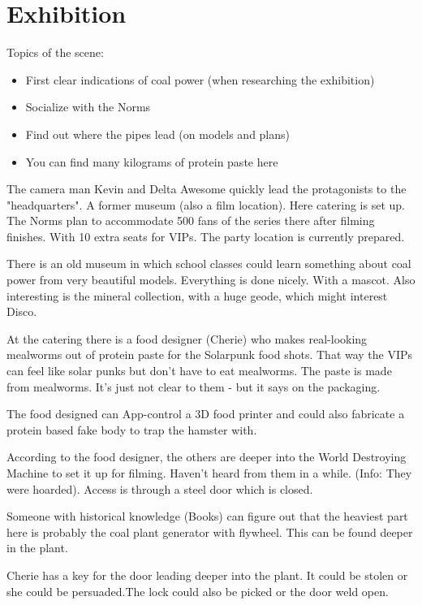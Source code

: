 \section{Exhibition}

Topics of the scene:
\begin{itemize}
\item First clear indications of coal power (when researching the exhibition)
\item Socialize with the Norms
\item Find out where the pipes lead (on models and plans)
\item You can find many kilograms of protein paste here
\end{itemize}


The camera man Kevin and Delta Awesome quickly lead the protagonists to the "headquarters". A former museum (also a film location). Here catering is set up. The Norms plan to accommodate 500 fans of the series there after filming finishes. With 10 extra seats for VIPs. The party location is currently prepared.

There is an old museum in which school classes could learn something about coal power from very beautiful models.
Everything is done nicely. With a mascot. Also interesting is the mineral collection, with a huge geode, which might interest Disco.

At the catering there is a food designer (Cherie) who makes real-looking mealworms out of protein paste for the Solarpunk food shots.  That way the VIPs can feel like solar punks but don't have to eat mealworms.
The paste is made from mealworms. It's just not clear to them - but it says on the packaging.

The food designed can App-control a 3D food printer and could also fabricate a protein based fake body to trap the hamster with.

According to the food designer, the others are deeper into the World Destroying Machine to set it up for filming. Haven't heard from them in a while. (Info: They were hoarded). Access is through a steel door which is closed.

Someone with historical knowledge (Books) can figure out that the heaviest part here is probably the coal plant generator with flywheel. This can be found deeper in the plant.

Cherie has a key for the door leading deeper into the plant. It could be stolen or she could be persuaded.The lock could also be picked or the door weld open.


